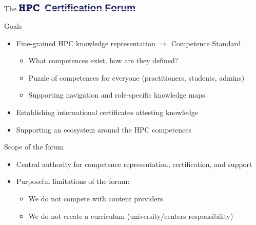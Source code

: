 \documentclass[compress,aspectratio=169]{beamer}
\begin{document}
\subsection{}

\begin{frame}{The \includegraphics[width=0.45\textwidth]{hpccf-full}}
		\begin{block}{Goals}
			\begin{itemize}
				\item Fine-grained HPC knowledge representation $\Rightarrow$ Competence Standard
          \begin{itemize}
            \item What competences exist, how are they defined?
            \item Puzzle of competences for everyone (practitioners, students, admins)
            \item Supporting navigation and role-specific knowledge maps
          \end{itemize}
				\item Establishing international certificates attesting knowledge
        \item Supporting an ecosystem around the HPC competences
			\end{itemize}
		\end{block}

    \begin{block}{Scope of the forum}
    \begin{itemize}
      \item Central authority for competence representation, certification, and support
      \item Purposeful limitations of the forum:
			\begin{itemize}
				\item We do not compete with content providers
				\item We do not create a curriculum (university/centers responsibility)
			\end{itemize}
    \end{itemize}
		\end{block}
\end{frame}
\end{document}
